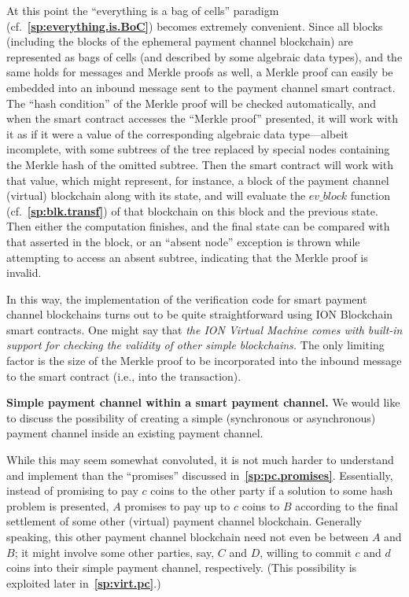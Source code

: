 \documentclass[12pt,oneside]{article}
\def\makepoint#1{\medbreak\noindent{\bf #1.\ }}
\def\nxsubpoint{\refstepcounter{subsubsection}%
  \smallbreak\makepoint{\thesubsubsection}}
\def\refpoint#1{{\rm\textbf{\ref{#1}}}}
\let\ptref=\refpoint
\def\embt(#1.){\textbf{#1.}}
\let\vr=\textit
\def\evblock{\vr{ev\_block}}
\begin{document}
At this point the ``everything is a bag of cells'' paradigm
(cf.~\ptref{sp:everything.is.BoC}) becomes extremely convenient. Since
all blocks (including the blocks of the ephemeral payment channel
blockchain) are represented as bags of cells (and described by some
algebraic data types), and the same holds for messages and Merkle
proofs as well, a Merkle proof can easily be embedded into an inbound
message sent to the payment channel smart contract. The ``hash
condition'' of the Merkle proof will be checked automatically, and
when the smart contract accesses the ``Merkle proof'' presented, it
will work with it as if it were a value of the corresponding algebraic
data type---albeit incomplete, with some subtrees of the tree replaced
by special nodes containing the Merkle hash of the omitted
subtree. Then the smart contract will work with that value, which
might represent, for instance, a block of the payment channel
(virtual) blockchain along with its state, and will evaluate the
$\evblock$ function (cf.~\ptref{sp:blk.transf}) of that blockchain on
this block and the previous state. Then either the computation
finishes, and the final state can be compared with that asserted in
the block, or an ``absent node'' exception is thrown while attempting
to access an absent subtree, indicating that the Merkle proof is
invalid.

In this way, the implementation of the verification code for smart
payment channel blockchains turns out to be quite straightforward
using ION Blockchain smart contracts. One might say that {\em the ION
  Virtual Machine comes with built-in support for checking the
  validity of other simple blockchains.} The only limiting factor is
the size of the Merkle proof to be incorporated into the inbound
message to the smart contract (i.e., into the transaction).

\nxsubpoint\label{sp:pc.within.pc} \embt(Simple payment channel within
a smart payment channel.)  We would like to discuss the possibility of
creating a simple (synchronous or asynchronous) payment channel inside
an existing payment channel.

While this may seem somewhat convoluted, it is not much harder to
understand and implement than the ``promises'' discussed
in~\ptref{sp:pc.promises}. Essentially, instead of promising to pay
$c$ coins to the other party if a solution to some hash problem is
presented, $A$ promises to pay up to $c$ coins to $B$ according to the
final settlement of some other (virtual) payment channel
blockchain. Generally speaking, this other payment channel blockchain
need not even be between $A$ and $B$; it might involve some other
parties, say, $C$ and $D$, willing to commit $c$ and $d$ coins into
their simple payment channel, respectively. (This possibility is
exploited later in~\ptref{sp:virt.pc}.)
\end{document}
